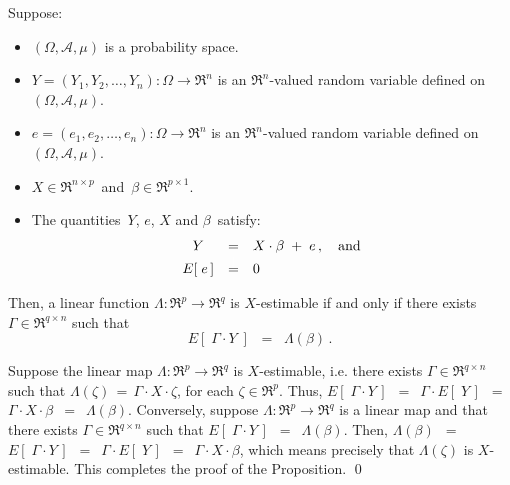 \begin{proposition}
\mbox{}\vskip 0.1cm\noindent
Suppose:
\begin{itemize}
\item
	$(\Omega,\mathcal{A},\mu)$ is a probability space.
\item
	$Y = (Y_{1}, Y_{2}, \ldots, Y_{n}) : \Omega \longrightarrow \Re^{n}$ is an $\Re^{n}$-valued random variable
	defined on $(\Omega,\mathcal{A},\mu)$.
\item
	$e = (e_{1}, e_{2}, \ldots, e_{n}) : \Omega \longrightarrow \Re^{n}$ is an $\Re^{n}$-valued random variable
	defined on $(\Omega,\mathcal{A},\mu)$.
\item
	$X \in \Re^{n \times p}$\, and \,$\beta \in \Re^{p \times 1}$.
\item
	The quantities \,$Y$, $e$, $X$ and $\beta$\, satisfy:
	\begin{equation*}
	\begin{array}{ccl}
	Y & = & X \cdot \beta \; + \; e\,, \quad\textnormal{and}
	\\
	E\!\left[\;e\,\right] & \overset{{\color{white}\vert}}{=} & 0
	\end{array}
	\end{equation*}
\end{itemize}
Then, a linear function $\Lambda : \Re^{p} \longrightarrow \Re^{q}$ is $X$-estimable
if and only if there exists $\Gamma \in \Re^{q \times n}$ such that
\begin{equation*}
E\!\left[\;\Gamma \cdot Y\;\right] \;\; = \;\; \Lambda(\beta)\,.
\end{equation*}
\end{proposition}
\proof
Suppose the linear map $\Lambda : \Re^{p} \longrightarrow \Re^{q}$
is $X$-estimable, i.e. there exists $\Gamma \in \Re^{q \times n}$ such that
$\Lambda(\zeta) \,=\, \Gamma \cdot X \cdot \zeta$, for each $\zeta \in \Re^{p}$.
Thus,
$E\!\left[\;\Gamma \cdot Y\,\right]$
\,$=$\, $\Gamma \cdot E\!\left[\;Y\,\right]$
\,$=$\, $\Gamma \cdot X \cdot \beta$
\,$=$\, $\Lambda(\beta)$.
Conversely, suppose $\Lambda : \Re^{p} \longrightarrow \Re^{q}$ is a linear map
and that there exists $\Gamma \in \Re^{q \times n}$ such that $E\!\left[\;\Gamma \cdot Y\,\right]$
\,$=$\, $\Lambda(\beta)$. Then,
$\Lambda(\beta)$
\,$=$\, $E\!\left[\;\Gamma \cdot Y\,\right]$
\,$=$\, $\Gamma \cdot E\!\left[\;Y\,\right]$
\,$=$\, $\Gamma \cdot X \cdot \beta$,
which means precisely that $\Lambda(\zeta)$ is $X$-estimable. 
This completes the proof of the Proposition.
\qed



